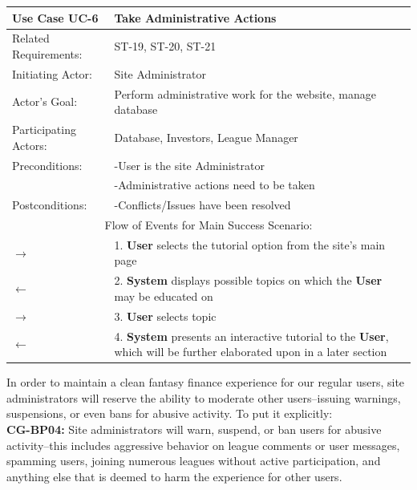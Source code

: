 \begin{centering}
\renewcommand\arraystretch{1.3} %
\label{UC-6}
\begin{longtable}{|p{1.2in} p{5in}|}
\hline
\bfseries{\color{color1}Use Case UC-6} &
\bfseries{\color{color1}Take Administrative Actions} \\
\hline
Related Requirements: & ST-19, ST-20, ST-21 \\
Initiating Actor:     & Site Administrator \\
Actor's Goal:         & Perform administrative work for the website, manage database \\
Participating Actors: & Database, Investors, League Manager \\
Preconditions:        & -User is the site Administrator \\
                      & -Administrative actions need to be taken \\
Postconditions:       & -Conflicts/Issues have been resolved \\
\hline
\multicolumn{2}{|c|}{\color{color1}Flow of Events for Main Success Scenario:}\\
\hline
$\rightarrow$ & 1. \textbf{User} selects the tutorial option from the site's main page \\
$\leftarrow$ & 2. \textbf{System} displays possible topics on which the \textbf{User} may be educated on \\
$\rightarrow$ & 3. \textbf{User} selects topic \\
$\leftarrow$ & 4. \textbf{System} presents an interactive tutorial to the \textbf{User}, which will be further elaborated upon in a later section \\
\hline
\end{longtable}
\end{centering}

In order to maintain a clean fantasy finance experience for our regular users, site
administrators will reserve the ability to moderate other users--issuing warnings,
suspensions, or even bans for abusive activity. To put it explicitly: \\

\textbf{CG-BP04:} Site administrators will warn, suspend, or ban users for abusive
activity--this includes aggressive behavior on league comments or user messages,
spamming users, joining numerous leagues without active participation, and anything
else that is deemed to harm the experience for other users. \\


